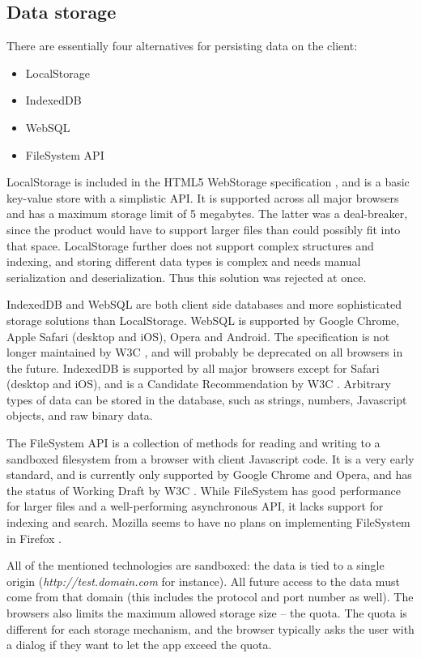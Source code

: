 \subsection{Data storage}

There are essentially four alternatives for persisting data on the client:

\begin{itemize}
\item LocalStorage
\item IndexedDB
\item WebSQL
\item FileSystem API
\end{itemize}

LocalStorage is included in the HTML5 WebStorage specification \cite{WebStorage:Online}, and is a basic key-value store with a simplistic API. It is supported across all major browsers and has a maximum storage limit of 5 megabytes. The latter was a deal-breaker, since the product would have to support larger files than could possibly fit into that space. LocalStorage further does not support complex structures and indexing, and storing different data types is complex and needs manual serialization and deserialization. Thus this solution was rejected at once.

IndexedDB and WebSQL are both client side databases and more sophisticated storage solutions than LocalStorage. WebSQL is supported by Google Chrome, Apple Safari (desktop and iOS), Opera and Android. The specification is not longer maintained by W3C \cite{WebSQL:Online}, and will probably be deprecated on all browsers in the future. IndexedDB is supported by all major browsers except for Safari (desktop and iOS), and is a Candidate Recommendation by W3C \cite{IndexedDB:Online}. Arbitrary types of data can be stored in the database, such as strings, numbers, Javascript objects, and raw binary data.

The FileSystem API is a collection of methods for reading and writing to a sandboxed filesystem from a browser with client Javascript code. It is a very early standard, and is currently only supported by Google Chrome and Opera, and has the status of Working Draft by W3C \cite{FileSystem:Online}. While FileSystem has good performance for larger files and a well-performing asynchronous API, it lacks support for indexing and search. Mozilla seems to have no plans on implementing FileSystem in Firefox \cite{MozillaFileSystem:Online}.

All of the mentioned technologies are sandboxed: the data is tied to a single origin (\emph{http://test.domain.com} for instance). All future access to the data must come from that domain (this includes the protocol and port number as well). The browsers also limits the maximum allowed storage size – the quota. The quota is different for each storage mechanism, and the browser typically asks the user with a dialog if they want to let the app exceed the quota.

